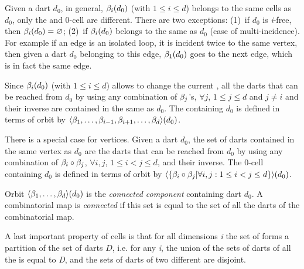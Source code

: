 Given a dart $d_0$, in general, $\beta_{i}(d_0)$ (with $1\leq i \leq d$)
belongs to the same cells as $d_0$, only the  and 0-cell are
different.  There are two exceptions: (1)~if $d_0$ is \emph{i}-free, then
$\beta_{i}(d_0)=\varnothing$; (2)~if $\beta_{i}(d_0)$ belongs to the same 
as $d_0$ (case of multi-incidence). For example if an edge is an isolated
loop, it is incident twice to the same vertex, then given a dart $d_0$
belonging to this edge, $\beta_{1}(d_0)$ goes to the next edge, which is in
fact the same edge.

Since $\beta_{i}(d_0)$ (with $1\leq i \leq d$) allows to change the
current , all the darts that can be reached from $d_0$ by
using any combination of $\beta_{j}$'s, $\forall j$, $1 \leq j \leq d$ and
$j\neq i$ and their inverse are contained in the same  as
$d_0$.  The  containing $d_0$ is defined in terms of orbit by
$\langle{}\beta_1,\ldots,\beta_{i-1},\beta_{i+1},\ldots,\beta_d\rangle{}(d_0)$.


There is a special case for vertices. Given a dart $d_0$, the set of
darts contained in the same vertex as $d_0$ are the darts that can be
reached from $d_0$ by using any combination of $\beta_{i}\circ\beta_{j}$,
$\forall i,j$, $1 \leq i< j \leq d$, and their inverse.  The 0-cell
containing $d_0$ is defined in terms of orbit by
$\langle{}\{\beta_{i}\circ\beta_{j}|\forall i,j: 1\leq i<j \leq d\}\rangle{}(d_0)$.



Orbit $\langle{}\beta_1,\ldots,\beta_d\rangle{}(d_0)$ is the \emph{connected
  component} containing dart $d_0$. A combinatorial map is
\emph{connected} if this set is equal to the set of all the darts
of the combinatorial map.

%

A last important property of cells is that for all dimensions \emph{i} the
set of  forms a partition of the set of darts $D$, i.e.  for
any \emph{i}, the union of the sets of darts of all the  is equal
to \emph{D}, and the sets of darts of two different  are disjoint.

